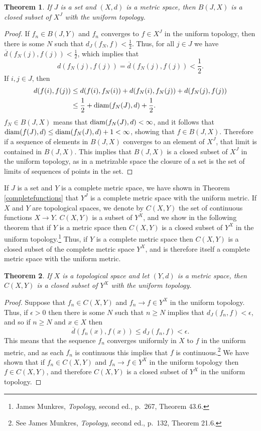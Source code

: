 \documentclass{article}
\newcommand{\diam}{\ensuremath\mathrm{diam}}
\newtheorem{theorem}{Theorem}
\theoremstyle{definition}
\begin{document}
\begin{theorem}
If $J$ is a set and $(X,d)$ is a metric space, then $B(J,X)$ is a closed subset of $X^J$ with the uniform topology.
\end{theorem}
\begin{proof}
If $f_n \in B(J,Y)$ and $f_n$ converges to $f \in X^J$ in the uniform topology, then there is some $N$ such that 
$d_J(f_N,f)<\frac{1}{2}$. Thus, for all $j \in J$ we have $\overline{d}(f_N(j),f(j))<\frac{1}{2}$, which implies
that
\[
d(f_N(j),f(j))=\overline{d}(f_N(j),f(j))<\frac{1}{2}.
\] If $i,j \in J$, then 
\begin{align*}
d(f(i),f(j))& \leq d(f(i),f_N(i)) + d(f_N(i),f_N(j)) + d(f_N(j),f(j))\\
&\leq \frac{1}{2} + \diam (f_N(J),d) + \frac{1}{2}.
\end{align*}
 $f_N \in B(J,X)$ means that  $\diam (f_N(J),d)<\infty$, and it follows that
$\diam (f(J),d) \leq \diam(f_N(J),d)+1<\infty$, showing that $f \in B(J,X)$.
Therefore if a sequence of elements in $B(J,X)$ converges to an element of $X^J$, that limit  is contained in $B(J,X)$. This implies that $B(J,X)$ is a
closed subset of $X^J$ in the uniform topology, as in a metrizable space the closure of a set is the set of limits of sequences
of points in the set.
\end{proof}



If $J$ is a set and $Y$ is a complete metric space, we have shown in Theorem \ref{completefunctions} that
$Y^J$ is a complete metric space with the uniform metric.
If $X$ and $Y$ are topological spaces, we denote by $C(X,Y)$ the set of continuous functions $X \to Y$.
$C(X,Y)$ is a subset of $Y^X$, and we show in the following theorem that if $Y$ is a  metric space then
$C(X,Y)$ is a closed subset of $Y^X$ in the uniform topology.\footnote{James Munkres,
{\em Topology}, second ed., p.~267, Theorem 43.6.} Thus, if $Y$ is a complete metric space then $C(X,Y)$ is a closed subset
of the complete metric space $Y^X$, and is therefore itself a complete metric space with the uniform metric.

\begin{theorem}
If $X$ is a topological space and let $(Y,d)$ is a metric space, then $C(X,Y)$ is a closed subset of $Y^X$ with the uniform topology.
\end{theorem}
\begin{proof}
Suppose that $f_n \in C(X,Y)$ and $f_n \to f \in Y^X$ in the uniform topology. 
Thus, if $\epsilon>0$ then there is some $N$ such that  $n \geq N$ implies that $d_J(f_n,f)<\epsilon$,
and so if $n \geq N$ and $x \in X$ then
\[
\overline{d}(f_n(x),f(x)) \leq d_J(f_n,f) < \epsilon.
\]
This means that the sequence $f_n$ converges uniformly in $X$ to $f$ in the uniform metric, and as each $f_n$ is continuous this implies
that $f$ is continuous.\footnote{See James Munkres, {\em Topology}, second ed., p.~132, Theorem 21.6.} We have shown that if
$f_n \in C(X,Y)$ and $f_n \to f \in Y^X$ in the uniform topology then $f \in C(X,Y)$, and therefore $C(X,Y)$ is a closed subset of $Y^X$ in the uniform topology.
\end{proof}
\end{document}
